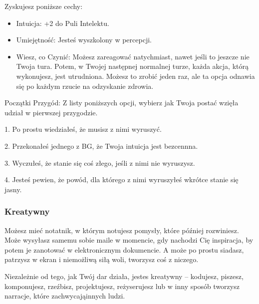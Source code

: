 Zyskujesz poniższe cechy:

\begin{itemize}
\item Intuicja: +2 do Puli Intelektu.
\item Umiejętność: Jesteś wyszkolony w percepcji.
\item Wiesz, co Czynić: Możesz zareagować natychmiast, nawet jeśli to jeszcze nie Twoja tura. Potem, w Twojej następnej normalnej turze, każda akcja, którą wykonujesz, jest utrudniona. Możesz to zrobić jeden raz, ale ta opcja odnawia się po każdym rzucie na odzyskanie zdrowia.
\end{itemize}

Początki Przygód: Z listy poniższych opcji, wybierz jak Twoja postać wzięła udział w pierwszej przygodzie.

1. Po prostu wiedziałeś, że musisz z nimi wyruszyć.

2. Przekonałeś jednego z BG, że Twoja intuicja jest bezcennna.

3. Wyczułeś, że stanie się coś złego, jeśli z nimi nie wyruszysz.

4. Jesteś pewien, że powód, dla którego z nimi wyruszyłeś wkrótce stanie się jasny.

\subsubsection{Kreatywny}

Możesz mieć notatnik, w którym notujesz pomysły, które później rozwiniesz. Może wysyłasz samemu sobie maile w momencie, gdy nachodzi Cię inspiracja, by potem je zanotować w elektronicznym dokumencie. A może po prostu siadasz, patrzysz w ekran i niemożliwą siłą woli, tworzysz coś z niczego.

Niezależnie od tego, jak Twój dar działa, jestes kreatywny – kodujesz, piszesz, komponujesz, rzeźbisz, projektujesz, reżyserujesz lub w inny sposób tworzysz narracje, które zachwycająinnych ludzi.

